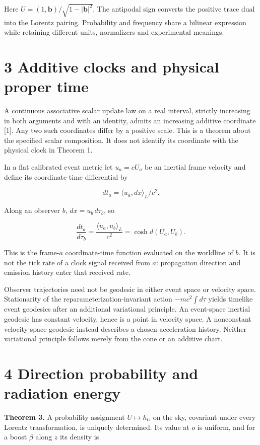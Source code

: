 \documentclass[
  11pt,
  a4paper,
]{article}
\begin{document}
Here \(U=(1,\mathbf b)/\sqrt{1-|\mathbf b|^2}\). The antipodal sign converts the positive trace dual into the Lorentz pairing. Probability and frequency share a bilinear expression while retaining different units, normalizers and experimental meanings.

\section{3 Additive clocks and physical proper time}\label{additive-clocks-and-physical-proper-time}

A continuous associative scalar update law on a real interval, strictly increasing in both arguments and with an identity, admits an increasing additive coordinate {[}1{]}. Any two such coordinates differ by a positive scale. This is a theorem about the specified scalar composition. It does not identify its coordinate with the physical clock in Theorem 1.

In a flat calibrated event metric let \(u_a=cU_a\) be an inertial frame velocity and define its coordinate-time differential by

\[dt_a=\langle u_a,dx\rangle_L/c^2.\]

Along an observer \(b\), \(dx=u_b\,d\tau_b\), so

\[\frac{dt_a}{d\tau_b}
=\frac{\langle u_a,u_b\rangle_L}{c^2}
=\cosh d(U_a,U_b).\]

This is the frame-\(a\) coordinate-time function evaluated on the worldline of \(b\). It is not the tick rate of a clock signal received from \(a\): propagation direction and emission history enter that received rate.

Observer trajectories need not be geodesic in either event space or velocity space. Stationarity of the reparameterization-invariant action \(-mc^2\int d\tau\) yields timelike event geodesics after an additional variational principle. An event-space inertial geodesic has constant velocity, hence is a point in velocity space. A nonconstant velocity-space geodesic instead describes a chosen acceleration history. Neither variational principle follows merely from the cone or an additive chart.

\section{4 Direction probability and radiation energy}\label{direction-probability-and-radiation-energy}

\textbf{Theorem 3.} A probability assignment \(U\mapsto h_U\) on the sky, covariant under every Lorentz transformation, is uniquely determined. Its value at \(o\) is uniform, and for a boost \(\beta\) along \(z\) its density is
\end{document}
